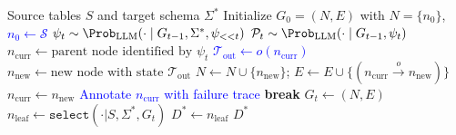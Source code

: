 

\begin{algorithm}[t]
\small
\caption{\sys: Tree-Based Agentic Inference}
\label{alg:sys}
\begin{algorithmic}[1]
\Require Source tables $S$ and target schema $\Sigma^*$
\State Initialize $G_0 = (N, E)$ with $N=\{n_0\}$, \textcolor{blue}{$n_0 \leftarrow \mathcal{S}$}
    \State \textcolor{blue}{$\psi_t \sim \Prob_{\text{LLM}}(\cdot \mid G_{t-1}, \Sigma^*, \psi_{<<t})$} 
    \State \textcolor{blue}{$\mathcal{P}_t \sim \Prob_{\text{LLM}}(\cdot \mid G_{t-1}, \psi_t)$} 
    \State $n_{\text{curr}} \leftarrow \text{parent node identified by } \psi_t$
        \State \textcolor{blue}{$\mathcal{T}_{\text{out}} \leftarrow o(n_{\text{curr}})$} 
            \State $n_{\text{new}} \leftarrow \text{new node with state } \mathcal{T}_{\text{out}}$
            \State $N \leftarrow N \cup \{n_{\text{new}}\}$; $E \leftarrow E \cup \{(n_{\text{curr}} \xrightarrow{o} n_{\text{new}})\}$
            \State $n_{\text{curr}} \leftarrow n_{\text{new}}$
        \Else
            \State \textcolor{blue}{Annotate $n_{\text{curr}}$ with failure trace}
            \State \textbf{break} 
        \EndIf
    \EndFor
    \State $G_t \leftarrow (N, E)$
\EndWhile
\State $n_\text{leaf}\leftarrow \mathtt{select} (\cdot|S,\Sigma^*, G_t)$
\State $D^*\leftarrow n_\text{leaf}$
\State \Return $D^*$
\end{algorithmic}
\end{algorithm}